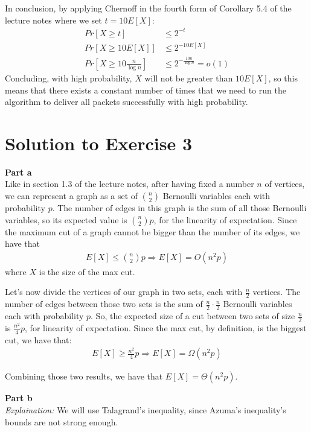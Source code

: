 \documentclass[a4paper,german]{article}
\begin{document}
In conclusion, by applying Chernoff in the fourth form of Corollary 5.4 of the lecture
notes where we set $t = 10 E[X]$:
\begin{align*}
	Pr[X \geq t]  &\leq 2^{-t} \\
	Pr[X \geq 10 E[X]]  &\leq 2^{- 10E[X]} \\
	Pr[X \geq 10 \frac{n} {\log n}]  &\leq 2^{- \frac{10n}{\log n}} = o(1)
\end{align*}
Concluding, with high probability, $X$ will not be greater than $10E[X]$,
so this means that there exists a constant number of times that we
need to run the algorithm to deliver all packets successfully with
high probability.






\section*{Solution to Exercise 3}
\textbf{Part a} \\
Like in section 1.3 of the lecture notes, after having fixed a number $n$ of
vertices, we can represent a graph as a set of ${n \choose 2}$ Bernoulli
variables each with probability $p$. The number of edges in this graph is the
sum of all those Bernoulli variables, so its expected value is ${n \choose 2}
p$, for the linearity of expectation. Since the maximum cut of a graph cannot
be bigger than the number of its edges, we have that 
\begin{align*}
	E[X] \leq {n \choose 2} p \Longrightarrow E[X] = O(n^2p)
\end{align*}
where $X$ is the size of the max cut.

Let's now divide the vertices of our graph in two sets, each with $\frac{n}{2}$ vertices. The number of edges between those two sets is the sum
of $\frac{n}{2} \cdot \frac{n}{2}$ Bernoulli variables each with probability
$p$. So, the expected size of a cut between two sets of size $\frac{n}{2}$ is
$\frac{n^2}{4}p$, for linearity of expectation. Since the max cut, by 
definition, is the biggest cut, we have that:
\begin{align*}
 E[X] \geq \frac{n^2}{4} p \Longrightarrow E[X] = \Omega(n^2p)
\end{align*}

Combining those two results, we have that $E[X] = \Theta(n^2p)$.

\vspace{1em}

\noindent
\textbf{Part b} \\
\emph{Explaination:} We will use Talagrand's inequality, since Azuma's inequality's bounds are not strong enough.
\end{document}
